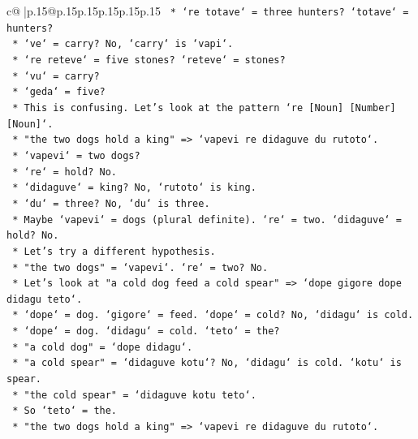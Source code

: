 \documentclass{article}
\begin{document}
{\begin{supertabular}{c@{$\;$}|p{.15\linewidth}@{}p{.15\linewidth}p{.15\linewidth}p{.15\linewidth}p{.15\linewidth}p{.15\linewidth}}
{{{\texttt{                    *   `re totave` = three hunters? `totave` = hunters?} \\
\texttt{                    *   `ve` = carry? No, `carry` is `vapi`.} \\
\texttt{                    *   `re reteve` = five stones? `reteve` = stones?} \\
\texttt{                    *   `vu` = carry?} \\
\texttt{                    *   `geda` = five?} \\
\texttt{                *   This is confusing. Let's look at the pattern `re {[}Noun{]} {[}Number{]} {[}Noun{]}`.} \\
\texttt{                *   "the two dogs hold a king" => `vapevi re didaguve du rutoto`.} \\
\texttt{                    *   `vapevi` = two dogs?} \\
\texttt{                    *   `re` = hold? No.} \\
\texttt{                    *   `didaguve` = king? No, `rutoto` is king.} \\
\texttt{                    *   `du` = three? No, `du` is three.} \\
\texttt{                    *   Maybe `vapevi` = dogs (plural definite). `re` = two. `didaguve` = hold? No.} \\
\texttt{                *   Let's try a different hypothesis.} \\
\texttt{                *   "the two dogs" = `vapevi`. `re` = two? No.} \\
\texttt{                *   Let's look at "a cold dog feed a cold spear" => `dope gigore dope didagu teto`.} \\
\texttt{                    *   `dope` = dog. `gigore` = feed. `dope` = cold? No, `didagu` is cold.} \\
\texttt{                    *   `dope` = dog. `didagu` = cold. `teto` = the?} \\
\texttt{                    *   "a cold dog" = `dope didagu`.} \\
\texttt{                    *   "a cold spear" = `didaguve kotu`? No, `didagu` is cold. `kotu` is spear.} \\
\texttt{                    *   "the cold spear" = `didaguve kotu teto`.} \\
\texttt{                    *   So `teto` = the.} \\
\texttt{                *   "the two dogs hold a king" => `vapevi re didaguve du rutoto`.} \\
}}}
\end{supertabular}}
\end{document}
